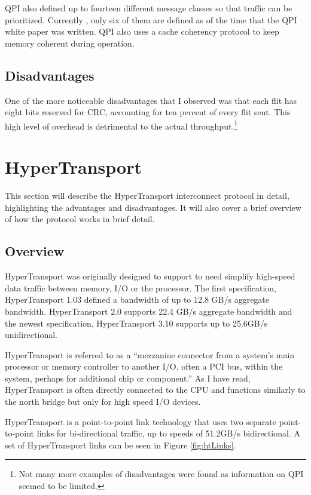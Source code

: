 \documentclass[conference]{IEEEtran}
\begin{document}
QPI also defined up to fourteen  different message classes so that traffic can
be prioritized. Currently , only six of them are defined as of the time that the
QPI white paper was written\cite{intelQPIintro}. QPI also uses a cache coherency
protocol to keep memory coherent during operation. 
\subsection{Disadvantages}

One of the more noticeable disadvantages that I observed was that each flit has
eight bits reserved for CRC, accounting for ten percent of every flit sent. This
high level of overhead is detrimental to the actual throughput.\footnote{Not
many more examples of disadvantages were found as information on QPI seemed to
be limited.}

\section{HyperTransport}
\label{sec:ht}
This section will describe the HyperTransport interconnect protocol in detail,
highlighting the advantages and disadvantages. It will also cover a brief
overview of how the protocol works in brief detail. 

\subsection{Overview}
\label{subsec:ht:over}
HyperTransport was originally designed to support to need simplify high-speed
data traffic between memory, I/O or the processor. The first
specification, HyperTransport 1.03 defined a bandwidth of up
to 12.8 GB/s aggregate bandwidth.\cite{htWhitePaper} HyperTransport 2.0
supports 22.4 GB/s aggregate bandwidth and the newest specification,
HyperTransport 3.10 supports up to 25.6GB/s unidirectional.

HyperTransport is referred to as a ``mezzanine connector from a system's main
processor or memory controller to another I/O, often a PCI bus, within the
system, perhaps for additional chip or component.''\cite{paulson2003ins} As I
have read, HyperTransport is often directly connected to the CPU and functions
similarly to the north bridge but only for high speed I/O devices. 

HyperTransport is a point-to-point link technology that uses two separate
point-to-point links for bi-directional traffic, up to speeds of 51.2GB/s
bidirectional. A set of HyperTransport links can be seen in Figure
\ref{fig:htLinks}. 
\end{document}

